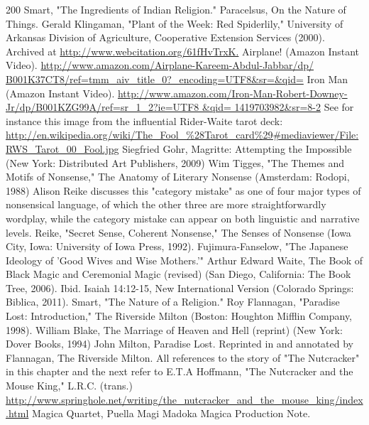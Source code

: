 \begin{thebibliography}{200}
    Smart, "The Ingredients of Indian Religion."
    Paracelsus, On the Nature of Things.
    Gerald Klingaman, "Plant of the Week: Red Spiderlily," University of Arkansas Division of Agriculture, Cooperative Extension Services (2000). Archived at \url{http://www.webcitation.org/61fHvTrxK.}
    Airplane! (Amazon Instant Video). \url{http://www.amazon.com/Airplane-Kareem-Abdul-Jabbar/dp/ B001K37CT8/ref=tmm_aiv_title_0?_encoding=UTF8&sr=&qid=}
    Iron Man (Amazon Instant Video). \url{http://www.amazon.com/Iron-Man-Robert-Downey-Jr/dp/B001KZG99A/ref=sr_1_2?ie=UTF8 &qid= 1419703982&sr=8-2}
    See for instance this image from the influential Rider-Waite tarot deck: \url{http://en.wikipedia.org/wiki/The_Fool_%28Tarot_card%29#mediaviewer/File:RWS_Tarot_00_Fool.jpg}
    Siegfried Gohr, Magritte: Attempting the Impossible (New York: Distributed Art Publishers, 2009)
    Wim Tigges, "The Themes and Motifs of Nonsense," The Anatomy of Literary Nonsense (Amsterdam: Rodopi, 1988)
    Alison Reike discusses this "category mistake" as one of four major types of nonsensical language, of which the other three are more straightforwardly wordplay, while the category mistake can appear on both linguistic and narrative levels. Reike, "Secret Sense, Coherent Nonsense," The Senses of Nonsense (Iowa City, Iowa: University of Iowa Press, 1992).
    Fujimura-Fanselow, "The Japanese Ideology of 'Good Wives and Wise Mothers.'"
    Arthur Edward Waite, The Book of Black Magic and Ceremonial Magic (revised) (San Diego, California: The Book Tree, 2006).
    Ibid.
    Isaiah 14:12-15, New International Version (Colorado Springs: Biblica, 2011).
    Smart, "The Nature of a Religion."
    Roy Flannagan, "Paradise Lost: Introduction," The Riverside Milton (Boston: Houghton Mifflin Company, 1998).
    William Blake, The Marriage of Heaven and Hell (reprint) (New York: Dover Books, 1994)
    John Milton, Paradise Lost. Reprinted in and annotated by Flannagan, The Riverside Milton.
    All references to the story of "The Nutcracker" in this chapter and the next refer to E.T.A Hoffmann, "The Nutcracker and the Mouse King," L.R.C. (trans.) \url{http://www.springhole.net/writing/the_nutcracker_and_the_mouse_king/index.html}
    Magica Quartet, Puella Magi Madoka Magica Production Note.    
\end{thebibliography}

